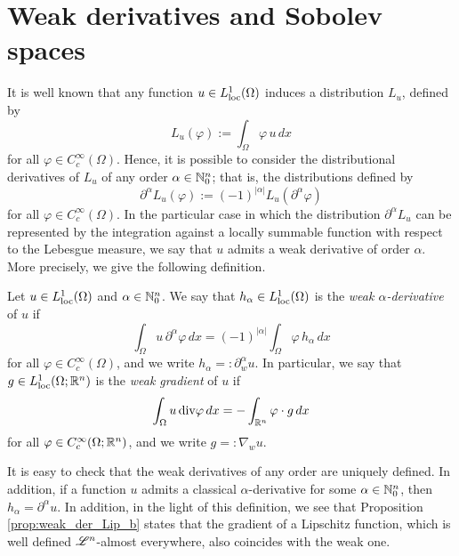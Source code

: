 \section{Weak derivatives and Sobolev spaces}

It is well known that any function $u \in L^{1}_{\rm loc}(\Omega)$ induces a distribution $L_{u}$, defined by
\begin{equation*}
L_{u}(\varphi) := \int_{\Omega} \varphi \, u \, dx
\end{equation*}
for all $\varphi \in C^{\infty}_{c}(\Omega)$. Hence, it is possible to consider the distributional derivatives of $L_{u}$ of any order $\alpha \in \mathbb{N}^{n}_{0}$; that is, the distributions defined by
\begin{equation*}
\partial^{\alpha} L_{u}(\varphi) := (-1)^{|\alpha|} L_{u}(\partial^{\alpha} \varphi)
\end{equation*}
for all $\varphi \in C^{\infty}_{c}(\Omega)$. In the particular case in which the distribution $\partial^{\alpha} L_{u}$ can be represented by the integration against a locally summable function with respect to the Lebesgue measure, we say that $u$ admits a weak derivative of order $\alpha$. More precisely, we give the following definition.

\begin{definition}
Let $u \in L^{1}_{\rm loc}(\Omega)$ and $\alpha \in \mathbb{N}^{n}_{0}$. We say that $h_{\alpha} \in L^{1}_{\rm loc}(\Omega)$ is the {\em weak $\alpha$-derivative} of $u$ if
\begin{equation*}
\int_{\Omega} u\, \partial^{\alpha} \varphi \,dx = (-1)^{|\alpha|} \int_{\Omega} \varphi \, h_{\alpha} \, dx
\end{equation*}
for all $\varphi \in C^{\infty}_{c}(\Omega)$, and we write $h_{\alpha} =: \partial^{\alpha}_{w} u$. In particular, we say that $g \in L^{1}_{\rm loc}(\Omega; \mathbb{R}^{n})$ is the {\em weak gradient} of $u$ if
\begin{equation*}
\int_{\Omega} u \, \mathrm{div} \varphi \,dx = - \int_{\mathbb{R}^{n}} \varphi \cdot g \, dx
\end{equation*}
for all $\varphi \in C^{\infty}_{c}(\Omega; \mathbb{R}^{n})$, and we write $g =: \nabla_{w} u$.
\end{definition}

It is easy to check that the weak derivatives of any order are uniquely defined. In addition, if a function $u$ admits a classical $\alpha$-derivative for some $\alpha \in \mathbb{N}_{0}^{n}$, then $h_{\alpha} = \partial^{\alpha} u$. In addition, in the light of this definition, we see that Proposition \ref{prop:weak_der_Lip_b} states that the gradient of a Lipschitz function, which is well defined $\mathscr{L}^{n}$-almost everywhere, also coincides with the weak one. 

